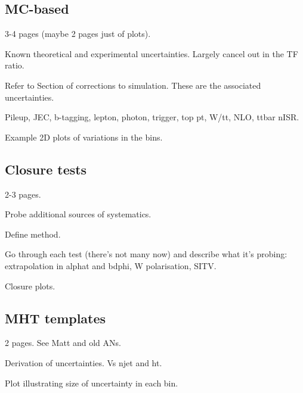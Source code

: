\subsection{MC-based}
3-4 pages (maybe 2 pages just of plots).

Known theoretical and experimental uncertainties.
Largely cancel out in the TF ratio.

Refer to Section of corrections to simulation. These are the associated 
uncertainties.

Pileup, JEC, b-tagging, lepton, photon, trigger, top pt, W/tt, NLO, ttbar nISR.

Example 2D plots of variations in the bins.

\subsection{Closure tests}
2-3 pages.

Probe additional sources of systematics.

Define method.

Go through each test (there's not many now) and describe what it's probing: 
extrapolation in alphat and bdphi, W polarisation, SITV.

Closure plots.

\subsection{MHT templates}
2 pages. See Matt and old ANs.

Derivation of uncertainties. Vs njet and ht.

Plot illustrating size of uncertainty in each bin.
